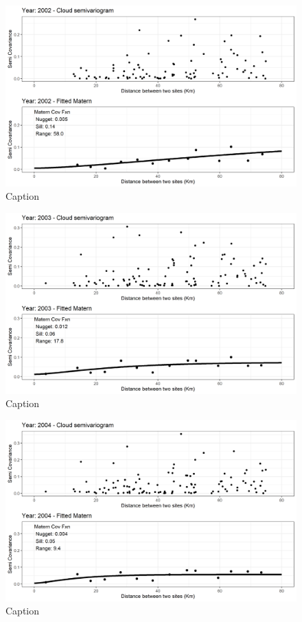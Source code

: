 \begin{figure}
    \centering
    \includegraphics{Figures/EmpiricalVariograms/Empirical_Variogram_2002.png}
    \caption{Caption}
    \label{fig:my_label}
\end{figure}

\begin{figure}
    \centering
    \includegraphics{Figures/EmpiricalVariograms/Empirical_Variogram_2003.png}
    \caption{Caption}
    \label{fig:my_label}
\end{figure}

\begin{figure}
    \centering
    \includegraphics{Figures/EmpiricalVariograms/Empirical_Variogram_2004.png}
    \caption{Caption}
    \label{fig:my_label}
\end{figure}


